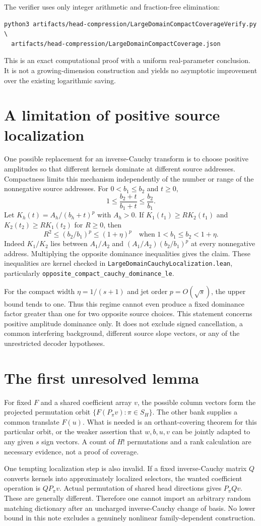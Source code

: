 \documentclass[11pt]{article}
\begin{document}
The verifier uses only integer arithmetic and fraction-free elimination:
\begin{verbatim}
python3 artifacts/head-compression/LargeDomainCompactCoverageVerify.py \
  artifacts/head-compression/LargeDomainCompactCoverage.json
\end{verbatim}
This is an exact computational proof with a uniform real-parameter
conclusion. It is not a growing-dimension construction and yields no
asymptotic improvement over the existing logarithmic saving.

\section{A limitation of positive source localization}
One possible replacement for an inverse-Cauchy transform is to choose
positive amplitudes so that different kernels dominate at different source
addresses. Compactness limits this mechanism independently of the number
or range of the nonnegative source addresses. For $0<b_1\leq b_2$ and
$t\geq0$,
\[
 1\leq\frac{b_2+t}{b_1+t}\leq\frac{b_2}{b_1}.
\]
Let $K_h(t)=A_h/(b_h+t)^p$ with $A_h>0$. If
$K_1(t_1)\geq R K_2(t_1)$ and
$K_2(t_2)\geq R K_1(t_2)$ for $R\geq0$, then
\[
 R^2\leq(b_2/b_1)^p\leq(1+\eta)^p
 \quad\text{when }1<b_1\leq b_2<1+\eta.
\]
Indeed $K_1/K_2$ lies between $A_1/A_2$ and
$(A_1/A_2)(b_2/b_1)^p$ at every nonnegative address. Multiplying the
opposite dominance inequalities gives the claim. These inequalities are
kernel checked in \texttt{LargeDomainCauchyLocalization.lean}, particularly
\texttt{opposite\_compact\_cauchy\_dominance\_le}.

For the compact width $\eta=1/(s+1)$ and jet order $p=O(\sqrt{s})$,
the upper bound tends to one. Thus this regime cannot even produce a
fixed dominance factor greater than one for two opposite source choices.
This statement concerns positive amplitude dominance only. It does not
exclude signed cancellation, a common interfering background, different
source slope vectors, or any of the unrestricted decoder hypotheses.

\section{The first unresolved lemma}
For fixed $F$ and a shared coefficient array $v$, the possible column
vectors form the projected permutation orbit $\{F(P_\pi v):\pi\in S_H\}$.
The other bank supplies a common translate $F(u)$.
What is needed is an orthant-covering theorem for this particular orbit,
or the weaker assertion that $w,b,u,v$ can be jointly adapted to any given
$s$ sign vectors. A count of $H!$ permutations and a rank calculation are
necessary evidence, not a proof of coverage.

One tempting localization step is also invalid. If a fixed inverse-Cauchy
matrix $Q$ converts kernels into approximately localized selectors, the
wanted coefficient operation is $QP_\pi v$. Actual permutation of shared
head directions gives $P_\pi Qv$. These are generally different. Therefore
one cannot import an arbitrary random matching dictionary after an
uncharged inverse-Cauchy change of basis. No lower bound in this note
excludes a genuinely nonlinear family-dependent construction.
\end{document}
